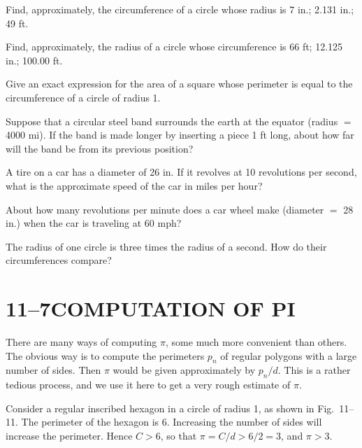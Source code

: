 \documentclass[11pt]{book}
\theoremstyle{bkplain}
\theoremstyle{XIplainnote}
\theoremstyle{bkplain}
\theoremstyle{bkplain}
\begin{document}
\begin{exercisecols}
\begin{exlist}
\item Find, approximately, the circumference of a circle whose radius is 7 in.;
      2.131 in.; 49 ft.
\item Find, approximately, the radius of a circle whose circumference is 66 ft;
      12.125 in.; 100.00 ft.
\item Give an exact expression for the area of a square whose perimeter is
      equal to the circumference of a circle of radius 1.
\item Suppose that a circular steel band surrounds the earth at the equator
      (radius $=$ 4000 mi). If the band is made longer by inserting a piece
      1 ft long, about how far will the band be from its previous position?
\item A tire on a car has a diameter of 26 in. If it revolves at 10 revolutions
      per second, what is the approximate speed of the car in miles per hour?
\item About how many revolutions per minute does a car wheel make (diameter
      $=$ 28 in.) when the car is traveling at 60 mph?
\item The radius of one circle is three times the radius of a second. How do
      their circumferences compare?
\end{exlist}
\end{exercisecols}

\section*{11--7\quad COMPUTATION OF PI}

There are many ways of computing $\pi$, some much more convenient than others.
The obvious way is to compute the perimeters $p_n$ of regular polygons with a
large number of sides. Then $\pi$ would be given approximately by $p_n/d$. This
is a rather tedious process, and we use it here to get a very rough estimate of
$\pi$.

\FIGXIELEVEN

Consider a regular inscribed hexagon in a circle of radius 1, as shown in
Fig.~11--11. The perimeter of the hexagon is 6. Increasing the number of sides
will increase the perimeter. Hence $C > 6$, so that $\pi = C/d > 6/2 = 3$, and
$\pi > 3$.
\end{document}
